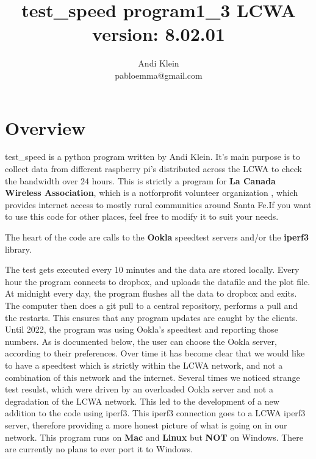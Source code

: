 \documentclass[11pt]{article}
\begin{document}
\author{ Andi Klein \\ pabloemma@gmail.com}
\title{ test\_speed program1\_3 LCWA \\ 
		\bf{version: 8.02.01}}
\maketitle
\setcounter{secnumdepth}{10}
\setcounter{tocdepth}{10}

\tableofcontents
\newpage

\newenvironment{andilist}{\begin{itemize} \em}{\end{itemize}}



\section{Overview}
test\_speed is a python program written by Andi Klein. It's main purpose is to collect data from different raspberry pi's distributed across the LCWA to check the bandwidth over 24 hours. This is strictly a program for \textbf{La Canada Wireless Association}, which is a notforprofit volunteer organization , which provides internet access to mostly rural communities around Santa Fe.If you want to use this code for other places, feel free to modify it to suit your needs.

The heart of the code are calls to the \textbf{Ookla} speedtest servers and/or the \textbf{iperf3} library. 

The test gets executed every 10 minutes and the data are stored locally. Every hour the program connects to dropbox, and uploads the datafile and the plot file. At midnight every day, the program flushes all the data to dropbox and exits. The computer then does a git pull to a central repository, performs a pull and the restarts. This ensures that any program updates are caught by the clients.
Until 2022, the program was using Ookla's speedtest and reporting those numbers. As is documented below, the user can choose the Ookla server, according to their preferences. Over time it has become clear that we would like to have a speedtest which is strictly within the LCWA network, and not a combination of this network and the internet. Several times we noticed strange test resulst, which were driven by an overloaded Ookla server and not a degradation of the LCWA network. This led to the development of a new addition to the code using iperf3. This iperf3 connection goes to a LCWA iperf3 server, therefore providing a more honest picture of what is going on in our network. This program runs on \textbf{Mac} and \textbf{Linux} but \textbf{NOT} on Windows. There are currently no plans to ever port it to Windows.
\end{document}
